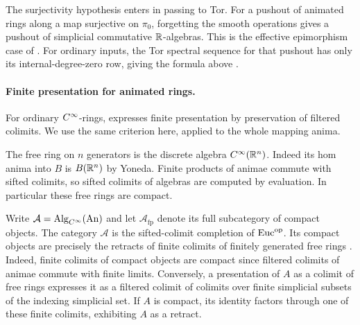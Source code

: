 The surjectivity hypothesis enters in passing to Tor. For a pushout
of animated rings along a map surjective on $\pi_0$, forgetting the
smooth operations gives a pushout of simplicial commutative
$\mathbb{R}$-algebras. This is the effective epimorphism case of
\citet[Theorem~3.32, Lemma~4.6 and Corollary~4.7]{Carchedi_Steffens_Universal_Derived_Manifolds}.
For ordinary inputs, the Tor spectral sequence for that pushout has
only its internal-degree-zero row, giving the formula above
\cite[Remark~4.2]{Carchedi_Steffens_Universal_Derived_Manifolds}.

\paragraph{Finite presentation for animated rings.}
For ordinary $C^\infty$-rings,  expresses
finite presentation by preservation of filtered colimits. We use the same
criterion here, applied to the whole mapping anima.


The free ring on $n$ generators is the discrete algebra $C^\infty(\mathbb{R}^n)$.
Indeed its hom anima into $B$ is $B(\mathbb{R}^n)$ by Yoneda. Finite products of
animae commute with sifted colimits, so sifted colimits of algebras
are computed by evaluation. In particular these free rings are compact.

Write $\mathcal A=\operatorname{Alg}_{C^\infty}(\operatorname{An})$ and let
$\mathcal A_{\mathrm{fp}}$ denote its full subcategory of compact
objects. The category $\mathcal A$ is the sifted-colimit completion of
$\mathrm{Euc}^{\mathrm{op}}$. Its compact objects are precisely the retracts of
finite colimits of finitely generated free rings
\cite[Theorems~3.10--3.11 and Lemma~3.21]{Carchedi_Steffens_Universal_Derived_Manifolds}.
Indeed, finite colimits of compact objects are compact since filtered
colimits of animae commute with finite limits. Conversely, a presentation
of $A$ as a colimit of free rings expresses it as a filtered colimit of
colimits over finite simplicial subsets of the indexing simplicial set.
If $A$ is compact, its identity factors through one of these finite
colimits, exhibiting $A$ as a retract.

